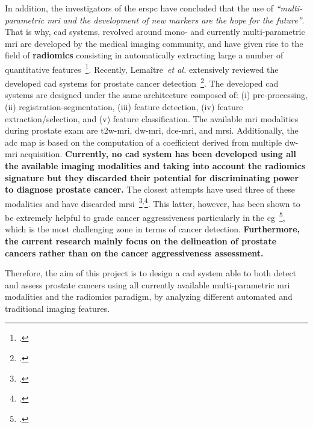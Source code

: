 In addition, the investigators of the \ac{erspc} have concluded that the use of \emph{``multi-parametric \ac{mri} and the development of new markers are the hope for the future''}.
That is why, \ac{cad} systems, revolved around mono- and currently multi-parametric \ac{mri} are developed by the medical imaging community, and have given rise to the field of \textbf{radiomics} consisting in automatically extracting large a number of quantitative features~\footcite{lambin2012radiomics}.
Recently, Lema\^itre~\emph{et al.} extensively reviewed the developed \ac{cad} systems for prostate cancer detection~\footcite{Lemaitre2015}.
The developed \ac{cad} systems are designed under the same architecture composed of: (i) pre-processing, (ii) registration-segmentation, (iii) feature detection, (iv) feature extraction/selection, and (v) feature classification.
The available \ac{mri} modalities during prostate exam are \ac{t2w}-\ac{mri}, \ac{dw}-\ac{mri}, \ac{dce}-\ac{mri}, and \ac{mrsi}. 
Additionally, the \ac{adc} map is based on the computation of a coefficient derived from multiple \ac{dw}-\ac{mri} acquisition.
\textbf{Currently, no \ac{cad} system has been developed using all the available imaging modalities and taking into account the radiomics signature but they discarded their potential for discriminating power to diagnose prostate cancer.}
The closest attempts have used three of these modalities and have discarded \ac{mrsi}~\footcite{Litjens2014}\textsuperscript{,}\footcite{Viswanath2011}.
This latter, however, has been shown to be extremely helpful to grade cancer aggressiveness particularly in the \ac{cg}~\footcite{Vos2015}, which is the most challenging zone in terms of cancer detection.
\textbf{Furthermore, the current research mainly focus on the delineation of prostate cancers rather than on the cancer aggressiveness assessment.}

% 

Therefore, the aim of this project is to design a \ac{cad} system able to both detect and assess prostate cancers using all currently available multi-parametric \ac{mri} modalities and the radiomics paradigm, by analyzing different automated and traditional imaging features.

